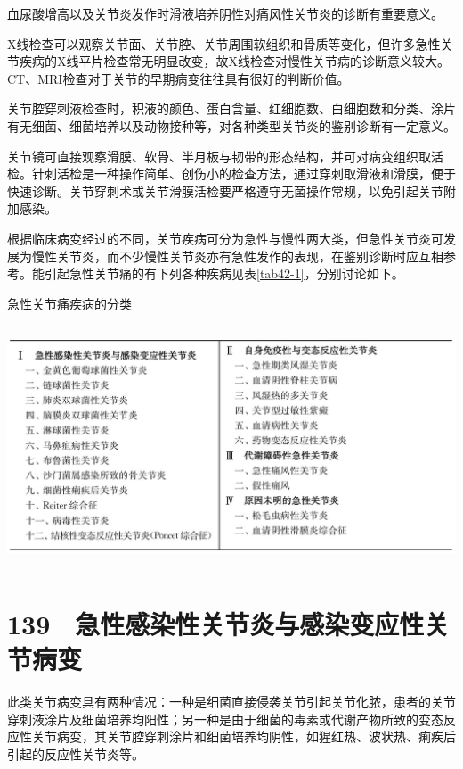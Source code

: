 血尿酸增高以及关节炎发作时滑液培养阴性对痛风性关节炎的诊断有重要意义。

X线检查可以观察关节面、关节腔、关节周围软组织和骨质等变化，但许多急性关节疾病的X线平片检查常无明显改变，故X线检查对慢性关节病的诊断意义较大。CT、MRI检查对于关节的早期病变往往具有很好的判断价值。

关节腔穿刺液检查时，积液的颜色、蛋白含量、红细胞数、白细胞数和分类、涂片有无细菌、细菌培养以及动物接种等，对各种类型关节炎的鉴别诊断有一定意义。

关节镜可直接观察滑膜、软骨、半月板与韧带的形态结构，并可对病变组织取活检。针刺活检是一种操作简单、创伤小的检查方法，通过穿刺取滑液和滑膜，便于快速诊断。关节穿刺术或关节滑膜活检要严格遵守无菌操作常规，以免引起关节附加感染。

根据临床病变经过的不同，关节疾病可分为急性与慢性两大类，但急性关节炎可发展为慢性关节炎，而不少慢性关节炎亦有急性发作的表现，在鉴别诊断时应互相参考。能引起急性关节痛的有下列各种疾病见表\ref{tab42-1}，分别讨论如下。

\begin{table}[htbp]
\centering
\caption{急性关节痛疾病的分类}
\label{tab42-1}
\includegraphics[width=5.90625in,height=2.83333in]{./images/Image00254.jpg}
\end{table}

\protect\hypertarget{text00323.html}{}{}

\section{139　急性感染性关节炎与感染变应性关节病变}

此类关节病变具有两种情况：一种是细菌直接侵袭关节引起关节化脓，患者的关节穿刺液涂片及细菌培养均阳性；另一种是由于细菌的毒素或代谢产物所致的变态反应性关节病变，其关节腔穿刺涂片和细菌培养均阴性，如猩红热、波状热、痢疾后引起的反应性关节炎等。

